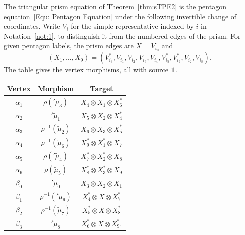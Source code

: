 \documentclass{amsart}
\begin{document}
\begin{theorem}\label{thm:PE-TPE}
The triangular prism equation of Theorem~\ref{thm:sTPE2} is the pentagon equation~\eqref{Equ: Pentagon Equation} under the following invertible change of coordinates. Write $V_i$ for the simple representative indexed by $i$ in Notation~\ref{not:1}, to distinguish it from the numbered edges of the prism. For given pentagon labels, the prism edges are $X=V_{i_0}$ and
\[
 (X_1,\ldots,X_9)=
 (V_{i_3}^*,V_{i_1},V_{i_2},V_{i_6},V_{i_4},V_{i_5}^*,
  V_{i_9}^*,V_{i_7},V_{i_8}).
\]
The table gives the vertex morphisms, all with source ${\bf 1}$.
\begin{center}\normalfont
\renewcommand{\arraystretch}{1.15}
\begin{tabular}{c|c|c}
Vertex & Morphism & Target\\\hline
$\alpha_1$ & $\rho({}'\widetilde\mu_3)$ & $X_4\otimes X_1\otimes X_6^*$\\
$\alpha_2$ & ${}'\widetilde\mu_1$ & $X_5\otimes X_2\otimes X_4^*$\\
$\alpha_3$ & $\rho^{-1}(\widetilde\mu_2)$ & $X_6\otimes X_3\otimes X_5^*$\\
$\alpha_4$ & $\rho^{-1}(\widetilde\mu_6)$ & $X_9^*\otimes X_1^*\otimes X_7$\\
$\alpha_5$ & $\rho({}'\widetilde\mu_4)$ & $X_7^*\otimes X_2^*\otimes X_8$\\
$\alpha_6$ & $\rho(\widetilde\mu_5)$ & $X_8^*\otimes X_3^*\otimes X_9$\\
$\beta_0$ & ${}'\widetilde\mu_0$ & $X_3\otimes X_2\otimes X_1$\\
$\beta_1$ & $\rho^{-1}({}'\widetilde\mu_9)$ & $X_4^*\otimes X\otimes X_7^*$\\
$\beta_2$ & $\rho^{-1}(\widetilde\mu_7)$ & $X_5^*\otimes X\otimes X_8^*$\\
$\beta_3$ & ${}'\widetilde\mu_8$ & $X_6^*\otimes X\otimes X_9^*$.
\end{tabular}
\end{center}
\end{theorem}
\end{document}
